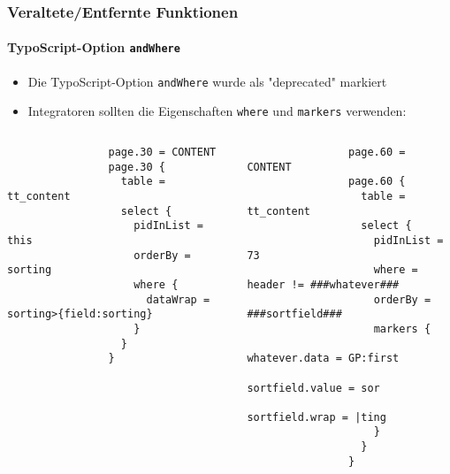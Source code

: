 \begin{frame}[fragile]
	\frametitle{Veraltete/Entfernte Funktionen}
	\framesubtitle{TypoScript-Option \texttt{andWhere}}

	\lstset{basicstyle=\tiny\ttfamily}

	\begin{itemize}
		\item Die TypoScript-Option \texttt{andWhere} wurde als "deprecated" markiert
		\item Integratoren sollten die Eigenschaften \texttt{where} und \texttt{markers} verwenden:
	\end{itemize}

	\begin{columns}[T]
		\begin{column}{.6\textwidth}

			\lstset{xleftmargin=1cm}

			\begin{lstlisting}
				page.30 = CONTENT
				page.30 {
				  table = tt_content
				  select {
				    pidInList = this
				    orderBy = sorting
				    where {
				      dataWrap = sorting>{field:sorting}
				    }
				  }
				}
			\end{lstlisting}
		\end{column}
		\begin{column}{.4\textwidth}
			\begin{lstlisting}
				page.60 = CONTENT
				page.60 {
				  table = tt_content
				  select {
				    pidInList = 73
				    where = header != ###whatever###
				    orderBy = ###sortfield###
				    markers {
				      whatever.data = GP:first
				      sortfield.value = sor
				      sortfield.wrap = |ting
				    }
				  }
				}
			\end{lstlisting}
		\end{column}
	\end{columns}

\end{frame}



